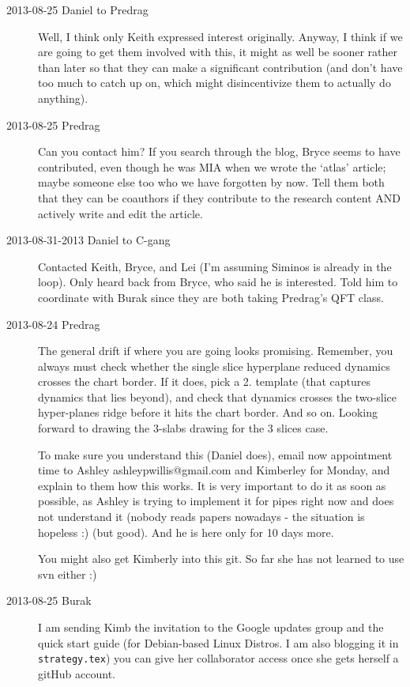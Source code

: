 \begin{description}
\item[2013-08-25 Daniel to Predrag] Well, I think only Keith expressed interest originally. Anyway, I think if we are going to get them involved with this, it might as well be sooner rather than later so that they can make a significant contribution (and don't have too much to catch up on, which might disincentivize them to actually do anything).

\item[2013-08-25 Predrag] Can you contact him? If you search through
the blog, Bryce seems to have contributed, even though he was MIA
when we wrote the `atlas' article; maybe someone else too who we have
forgotten by now. Tell them both that they can be coauthors if they
contribute to the research content AND actively write and edit the
article.

\item[2013-08-31-2013 Daniel to C-gang] Contacted Keith, Bryce, and Lei (I'm assuming Siminos is already in the loop). Only heard back from Bryce, who said he is interested. Told him to coordinate with Burak since they are both taking Predrag's QFT class.

\item[2013-08-24 Predrag]
The general drift if where you are going looks promising. Remember,
you always must check whether the single slice hyperplane reduced
dynamics crosses the chart border. If it does, pick a 2. template
(that captures dynamics that lies beyond), and check that dynamics
crosses the two-slice hyper-planes ridge before it hits the chart
border. And so on. Looking forward to drawing the 3-slabs drawing for
the 3 slices case.

To make sure you understand this (Daniel does), email now appointment
time to Ashley ashleypwillis@gmail.com and Kimberley for Monday, and
explain to them how this works. It is very important to do it as soon as
possible, as Ashley is trying to implement it for pipes right now and
does not understand it (nobody reads papers nowadays -
the situation is hopeless :) (but good). And he is here only for 10
days more.

You might also get Kimberly into this git. So far she has not learned
to use svn either :)

\item[2013-08-25 Burak] I am sending Kimb the invitation to the Google updates group and the quick start guide (for Debian-based Linux Distros. I am also blogging it in \texttt{strategy.tex}) you can give her collaborator access once she gets herself a gitHub account.


\end{description}
